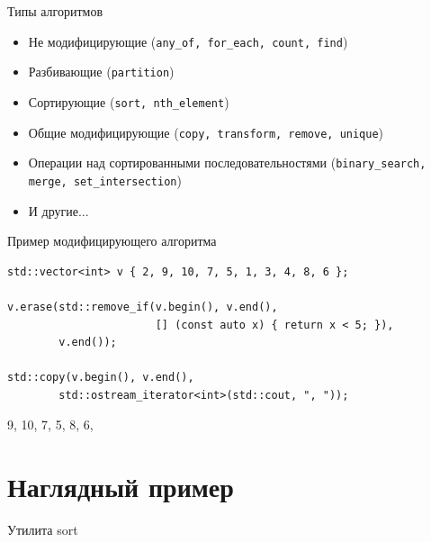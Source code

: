 \documentclass[unknownkeysallowed,xcolor=table]{beamer}
\begin{document}
\begin{frame}{Типы алгоритмов}

\begin{itemize}
  \item Не модифицирующие (\lstinline{any_of, for_each, count, find}) \vspace{1em}
  \item Разбивающие (\lstinline{partition}) \vspace{1em}
  \item Сортирующие (\lstinline{sort, nth_element}) \vspace{1em}
  \item Общие модифицирующие (\lstinline{copy, transform, remove, unique}) \vspace{1em}
  \item Операции над сортированными последовательностями (\lstinline{binary_search, merge, set_intersection}) \vspace{1em}
  \item И другие...
\end{itemize}

\end{frame}

\begin{frame}[fragile]{Пример модифицирующего алгоритма}

\begin{lstlisting}
std::vector<int> v { 2, 9, 10, 7, 5, 1, 3, 4, 8, 6 };

v.erase(std::remove_if(v.begin(), v.end(),
                       [] (const auto x) { return x < 5; }),
        v.end());
        
std::copy(v.begin(), v.end(),
        std::ostream_iterator<int>(std::cout, ", "));
\end{lstlisting}

\begin{cmdlinelarge}
9, 10, 7, 5, 8, 6,
\end{cmdlinelarge}

\end{frame}


\section{Наглядный пример}

\begin{frame}[fragile]{Утилита sort}


\end{frame}
\end{document}
